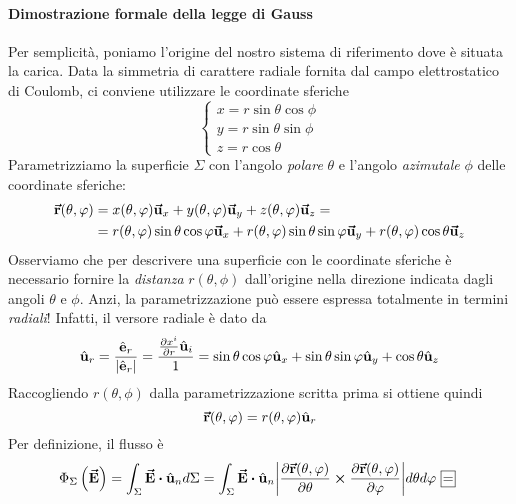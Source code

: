 \paragraph{Dimostrazione formale della legge di Gauss}
\begin{demonstration}
	Per semplicità, poniamo l'origine del nostro sistema di riferimento dove è situata la carica. Data la simmetria di carattere radiale fornita dal campo elettrostatico di Coulomb, ci conviene utilizzare le coordinate sferiche
	\begin{equation*}
		\begin{cases}
			x=r\sin\theta\cos\phi\\
			y=r\sin\theta\sin\phi\\
			z=r\cos\theta
		\end{cases}
	\end{equation*}
	Parametrizziamo la superficie $\Sigma$ con l'angolo \textit{polare} $\theta$ e l'angolo \textit{azimutale} $\phi$ delle coordinate sferiche:
	\begin{align*}
		\vb*{\va{r}}(\theta,\varphi)&=x(\theta,\varphi)\vb*{\va{u}}_x+y(\theta,\varphi)\vb*{\va{u}}_y+z(\theta,\varphi)\vb*{\va{u}}_z=\\
		&=r(\theta,\varphi)\sin\theta\cos\varphi\vb*{\va{u}}_x+r(\theta,\varphi)\sin\theta\sin\varphi\vb*{\va{u}}_y+r(\theta,\varphi)\cos\theta\vb*{\va{u}}_z
	\end{align*}
	Osserviamo che per descrivere una superficie con le coordinate sferiche è necessario fornire la \textit{distanza} $r(\theta,\phi)$ dall'origine nella direzione indicata dagli angoli $\theta$ e $\phi$. Anzi, la parametrizzazione può essere espressa totalmente in termini \textit{radiali}! Infatti, il versore radiale è dato da
	\begin{equation*}
		\hat{\mathbf{u}}_r=\frac{\hat{\mathbf{e}}_r}{\abs{\hat{\mathbf{e}}_r}}=\frac{\pdv{x^i}{r}\hat{\mathbf{u}}_i}{1}=\sin\theta\cos\varphi\hat{\mathbf{u}}_x+\sin\theta\sin\varphi\hat{\mathbf{u}}_y+\cos\theta\hat{\mathbf{u}}_z
	\end{equation*}
	Raccogliendo $r(\theta,\phi)$ dalla parametrizzazione scritta prima si ottiene quindi
	\begin{equation*}
		\vb*{\va{r}}(\theta,\varphi)=r(\theta,\varphi)\hat{\mathbf{u}}_r
	\end{equation*}
	Per definizione, il flusso è
	\begin{equation*}
		\Phi_{\Sigma}\left(\vba{E}\right)=\int_{\Sigma}\vba{E}\vdot\vbh{u}_nd\Sigma=\int_{\Sigma}\vba{E}\vdot\vbh{u}_n\abs{\pdv{\vba{r}(\theta,\phi)}{\theta}\cross\pdv{\vba{r}(\theta,\phi)}{\phi}}d\theta d\phi\squarequal
	\end{equation*}

\end{demonstration}
